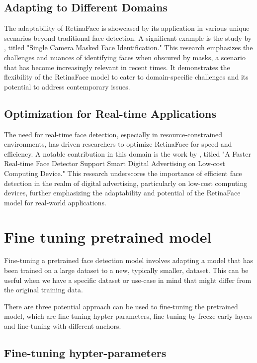 \documentclass{article}
\begin{document}
\subsection{Adapting to Different Domains}
The adaptability of RetinaFace is showcased by its application in various unique scenarios beyond traditional face detection. A significant example is the study by \cite{aswal2020single}, titled "Single Camera Masked Face Identification." This research emphasizes the challenges and nuances of identifying faces when obscured by masks, a scenario that has become increasingly relevant in recent times. It demonstrates the flexibility of the RetinaFace model to cater to domain-specific challenges and its potential to address contemporary issues.

\subsection{Optimization for Real-time Applications}
The need for real-time face detection, especially in resource-constrained environments, has driven researchers to optimize RetinaFace for speed and efficiency. A notable contribution in this domain is the work by \cite{putro2022faster}, titled "A Faster Real-time Face Detector Support Smart Digital Advertising on Low-cost Computing Device." This research underscores the importance of efficient face detection in the realm of digital advertising, particularly on low-cost computing devices, further emphasizing the adaptability and potential of the RetinaFace model for real-world applications.

\section{Fine tuning pretrained model}

Fine-tuning a pretrained face detection model involves adapting a model that has been trained on a large dataset to a new, typically smaller, dataset. 
This can be useful when we have a specific dataset or use-case in mind that might differ from the original training data. 

There are three potential approach can be used to fine-tuning the pretrained model,
which are fine-tuning hypter-parameters, fine-tuning by freeze early layers and fine-tuning with different anchors.

\subsection{Fine-tuning hypter-parameters}
\end{document}
